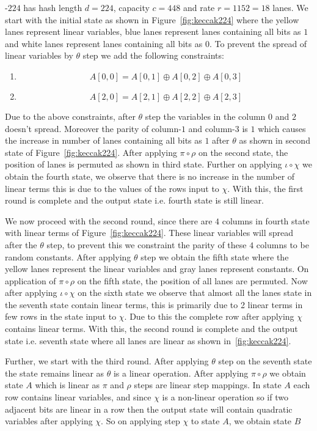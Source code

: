 \KECCAK{}-$224$ has hash length $d=224$, capacity $c=448$ and rate $r = 1152 = 18$ lanes. We start with the initial state as shown in Figure~\ref{fig:keccak224} where the yellow lanes represent linear variables, blue lanes represent lanes containing all bits as $1$ and white lanes represent lanes containing all bits as $0$. To prevent the spread of linear variables by $\theta$ step we add the following constraints:

\begin{enumerate}
    \item \[
        A[0,0] = A[0,1] \oplus A[0,2] \oplus A[0, 3]
    \]
\item \[
        A[2,0] = A[2,1] \oplus A[2,2] \oplus A[2,3]
    \]
\end{enumerate}

Due to the above constraints, after $\theta$ step the variables in the column $0$ and $2$ doesn't spread. Moreover the parity of column-$1$ and column-$3$ is $1$ which causes the increase in number of lanes containing all bits as $1$ after $\theta$ as shown in second state of Figure~\ref{fig:keccak224}. After applying $\pi \circ \rho$ on the second state, the position of lanes is permuted as shown in third state. Further on applying $\iota \circ \chi$ we obtain the fourth state, we observe that there is no increase in the number of linear terms this is due to the values of the rows input to $\chi$. With this, the first round is complete and the output state i.e. fourth state is still linear.

We now proceed with the second round, since there are $4$ columns in fourth state with linear terms  of Figure~\ref{fig:keccak224}. These linear variables will spread after the $\theta$ step, to prevent this we constraint the parity of these $4$ columns to be random constants. After applying $\theta$ step we obtain the fifth state where the yellow lanes represent the linear variables and gray lanes represent constants. On application of $\pi \circ \rho$ on the fifth state, the position of all lanes are permuted. Now after applying $\iota \circ \chi$ on the sixth state we observe that almost all the lanes state in the seventh state contain linear terms, this is primarily due to 2 linear terms in few rows in the state input to $\chi$. Due to this the complete row after applying $\chi$ contains linear terms. With this, the second round is complete and the output state i.e. seventh state where all lanes are linear as shown in~\ref{fig:keccak224}.

Further, we start with the third round. After applying $\theta$ step on the seventh state the state remains linear as $\theta$ is a linear operation. After applying $\pi \circ \rho$ we obtain state $A$ which is linear as $\pi$ and $\rho$ steps are linear step mappings. In state $A$ each row contains linear variables, and since $\chi$ is a non-linear operation so if two adjacent bits are linear in a row then the output state will contain quadratic variables after applying $\chi$. So on applying step $\chi$ to state $A$, we obtain state $B$ 

